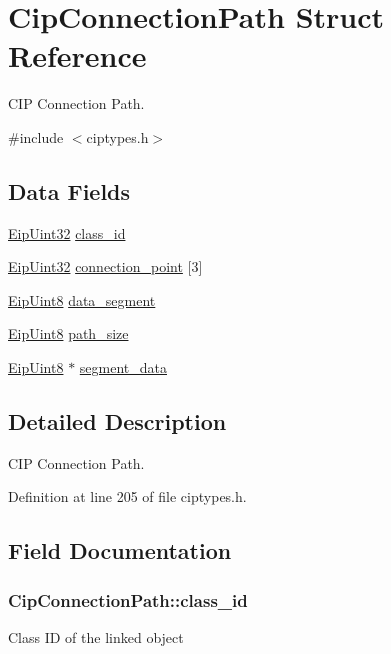 \hypertarget{structCipConnectionPath}{\section{\-Cip\-Connection\-Path \-Struct \-Reference}
\label{dd/d06/structCipConnectionPath}
}


\-C\-I\-P \-Connection \-Path.  




{\ttfamily \#include $<$ciptypes.\-h$>$}

\subsection*{\-Data \-Fields}
\begin{DoxyCompactItemize}
\item 
\hyperlink{typedefs_8h_abf2dd49262551294eb990ef8746a2767}{\-Eip\-Uint32} \hyperlink{structCipConnectionPath_ac8161b95364182279d18be321752ee15}{class\-\_\-id}
\item 
\hyperlink{typedefs_8h_abf2dd49262551294eb990ef8746a2767}{\-Eip\-Uint32} \hyperlink{structCipConnectionPath_a4f909044fc44d1e1028c105f045aca1d}{connection\-\_\-point} \mbox{[}3\mbox{]}
\item 
\hyperlink{typedefs_8h_aa0c108ee762a27720919a4634643040e}{\-Eip\-Uint8} \hyperlink{structCipConnectionPath_ad67cf3370c00161393ded7f91a0b690f}{data\-\_\-segment}
\item 
\hyperlink{typedefs_8h_aa0c108ee762a27720919a4634643040e}{\-Eip\-Uint8} \hyperlink{structCipConnectionPath_a2647aaa699156b7ef9a0394f3abe27c2}{path\-\_\-size}
\item 
\hyperlink{typedefs_8h_aa0c108ee762a27720919a4634643040e}{\-Eip\-Uint8} $\ast$ \hyperlink{structCipConnectionPath_a36d55ac33899e7eb25067a83ffdfaba1}{segment\-\_\-data}
\end{DoxyCompactItemize}


\subsection{\-Detailed \-Description}
\-C\-I\-P \-Connection \-Path. 



\-Definition at line 205 of file ciptypes.\-h.



\subsection{\-Field \-Documentation}
\hypertarget{structCipConnectionPath_ac8161b95364182279d18be321752ee15}{
\subsubsection[{class\-\_\-id}]{ {\bf \-Cip\-Connection\-Path\-::class\-\_\-id}}}\label{dd/d06/structCipConnectionPath_ac8161b95364182279d18be321752ee15}
\-Class \-I\-D of the linked object 

